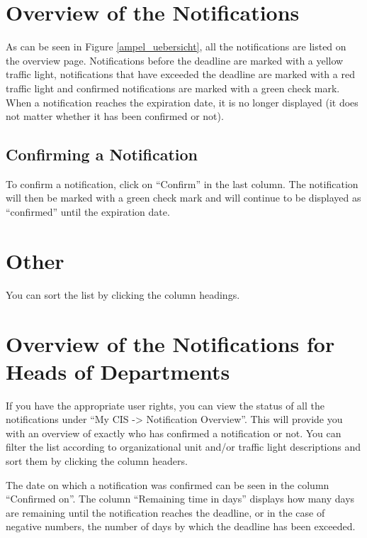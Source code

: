 \section{Overview of the Notifications}
\label{ampeluebersicht}

As can be seen in Figure \ref{ampel_uebersicht}, all the notifications are listed on the overview page. Notifications before the deadline are marked with a yellow traffic light, notifications that have exceeded the deadline are marked with a red traffic light and confirmed notifications are marked with a green check mark.
When a notification reaches the expiration date, it is no longer displayed (it does not matter whether it has been confirmed or not).

\subsection{Confirming a Notification}

To confirm a notification, click on "`Confirm"' in the last column. The notification will then be marked with a green check mark and will continue to be displayed as "`confirmed"' until the expiration date.

\section{Other}

You can sort the list by clicking the column headings.

\section{Overview of the Notifications for Heads of Departments}
\label{ampeluebersicht_leiterinnen}

If you have the appropriate user rights, you can view the status of all the notifications under "`My CIS -> Notification Overview"'.
This will provide you with an overview of exactly who has confirmed a notification or not.
You can filter the list according to organizational unit and/or traffic light descriptions and sort them by clicking the column headers.

The date on which a notification was confirmed can be seen in the column "`Confirmed on"'.
The column "`Remaining time in days"' displays how many days are remaining until the notification reaches the deadline, or in the case of negative numbers, the number of days by which the deadline has been exceeded.
